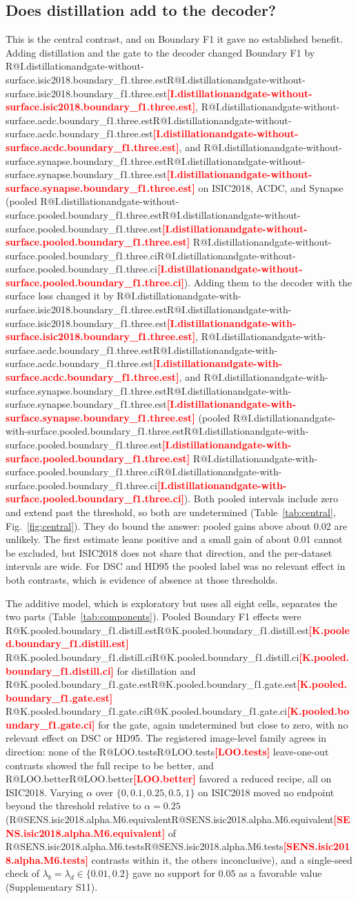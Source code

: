 \documentclass[fleqn,10pt,lineno]{wlpeerj}
\makeatletter
\newcommand{\R}[1]{\ifcsname R@#1\endcsname\csname R@#1\endcsname\else\textbf{\textcolor{red}{[#1]}}\fi}
\makeatother
\begin{document}
\subsection*{Does distillation add to the decoder?}
This is the central contrast, and on Boundary F1 it gave no established benefit. Adding distillation and the gate to the decoder changed Boundary F1 by \R{I.distillationandgate-without-surface.isic2018.boundary_f1.three.est}, \R{I.distillationandgate-without-surface.acdc.boundary_f1.three.est}, and \R{I.distillationandgate-without-surface.synapse.boundary_f1.three.est} on ISIC2018, ACDC, and Synapse (pooled \R{I.distillationandgate-without-surface.pooled.boundary_f1.three.est} \R{I.distillationandgate-without-surface.pooled.boundary_f1.three.ci}). Adding them to the decoder with the surface loss changed it by \R{I.distillationandgate-with-surface.isic2018.boundary_f1.three.est}, \R{I.distillationandgate-with-surface.acdc.boundary_f1.three.est}, and \R{I.distillationandgate-with-surface.synapse.boundary_f1.three.est} (pooled \R{I.distillationandgate-with-surface.pooled.boundary_f1.three.est} \R{I.distillationandgate-with-surface.pooled.boundary_f1.three.ci}). Both pooled intervals include zero and extend past the threshold, so both are undetermined (Table~\ref{tab:central}, Fig.~\ref{fig:central}). They do bound the answer: pooled gains above about 0.02 are unlikely. The first estimate leans positive and a small gain of about 0.01 cannot be excluded, but ISIC2018 does not share that direction, and the per-dataset intervals are wide. For DSC and HD95 the pooled label was no relevant effect in both contrasts, which is evidence of absence at those thresholds.

The additive model, which is exploratory but uses all eight cells, separates the two parts (Table~\ref{tab:components}). Pooled Boundary F1 effects were \R{K.pooled.boundary_f1.distill.est} \R{K.pooled.boundary_f1.distill.ci} for distillation and \R{K.pooled.boundary_f1.gate.est} \R{K.pooled.boundary_f1.gate.ci} for the gate, again undetermined but close to zero, with no relevant effect on DSC or HD95. The registered image-level family agrees in direction: none of the \R{LOO.tests} leave-one-out contrasts showed the full recipe to be better, and \R{LOO.better} favored a reduced recipe, all on ISIC2018. Varying $\alpha$ over $\{0,0.1,0.25,0.5,1\}$ on ISIC2018 moved no endpoint beyond the threshold relative to $\alpha=0.25$ (\R{SENS.isic2018.alpha.M6.equivalent} of \R{SENS.isic2018.alpha.M6.tests} contrasts within it, the others inconclusive), and a single-seed check of $\lambda_b=\lambda_d\in\{0.01,0.2\}$ gave no support for $0.05$ as a favorable value (Supplementary S11).
\end{document}
